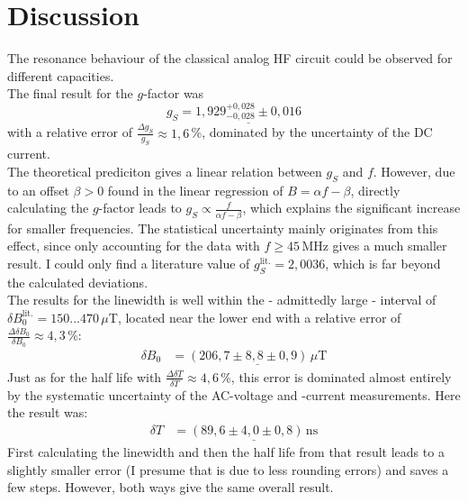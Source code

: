 \documentclass[a4paper,12pt]{article}
\newcommand{\kla}{}
\newcommand{\tecxt}{}
\begin{document}
\section{Discussion}
The resonance behaviour of the classical analog HF circuit could be observed for different capacities. \\
The final result for the $g$-factor was
$$g_S=\underline{1,929_{-0,028}^{+0,028}\pm 0,016}$$
with a relative error of $\frac{\Delta g_S}{g_S}\approx 1,6\,$\%, dominated by the uncertainty of the DC current.\\
The theoretical prediciton gives a linear relation between $g_S$ and $f$. However, due to an offset $\beta>0$ found in the linear regression of $B=\alpha f-\beta$, directly calculating the $g$-factor leads to $g_S\propto\frac{f}{\alpha f-\beta}$, which explains the significant increase for smaller frequencies. The statistical uncertainty mainly originates from this effect, since only accounting for the data with $f\ge 45\,$MHz gives a much smaller result. I could only find a literature value of $g_S^\tecxt\text{lit.}=2,0036$, which is far beyond the calculated deviations.\\
The results for the linewidth is well within the - admittedly large - interval of $\delta B_0^\tecxt\text{lit.}= 150\dots 470\,\mu$T, located near the lower end with a relative error of $\frac{\Delta\delta B_0}{\delta B_0}\approx 4,3\,$\%:
\begin{align*}
\delta B_0&=\underline{\kla\left( {206,7\pm 8,8\pm 0,9} \right)\,\mu\tecxt\text{T}}
\end{align*}
Just as for the half life with $\frac{\Delta\delta T}{\delta T}\approx 4,6\,$\%, this error is dominated almost entirely by the systematic uncertainty of the AC-voltage and -current measurements. Here the result was:
\begin{align*}
\delta T&=\underline{\kla\left( {89,6\pm 4,0\pm 0,8} \right)\,\tecxt\text{ns}}
\end{align*}
First calculating the linewidth and then the half life from that result leads to a slightly smaller error (I presume that is due to less rounding errors) and saves a few steps. However, both ways give the same overall result.
\end{document}
